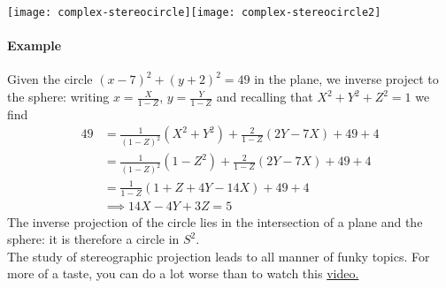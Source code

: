 \begin{center}
\texttt{[image: complex-stereocircle]}\qquad \texttt{[image: complex-stereocircle2]}
\end{center}

\paragraph{Example}
Given the circle $(x-7)^2+(y+2)^2=49$ in the plane, we inverse project to the sphere: writing $x=\frac X{1-Z}$, $y=\frac Y{1-Z}$ and recalling that $X^2+Y^2+Z^2=1$ we find
\begin{align*}
49&=\frac 1{(1-Z)^2}(X^2+Y^2)+\frac 2{1-Z}(2Y-7X)+49+4\\
&=\frac 1{(1-Z)^2}(1-Z^2)+\frac 2{1-Z}(2Y-7X)+49+4\\
&=\frac 1{1-Z}(1+Z+4Y-14X)+49+4\\
&\implies 14X-4Y+3Z=5
\end{align*}
The inverse projection of the circle lies in the intersection of a plane and the sphere: it is therefore a circle in $S^2$.\\

The study of stereographic projection leads to all manner of funky topics. For more of a taste, you can do a lot worse than to watch this \href{https://www.youtube.com/watch?v=pWOMDm6ejlw}{video.}